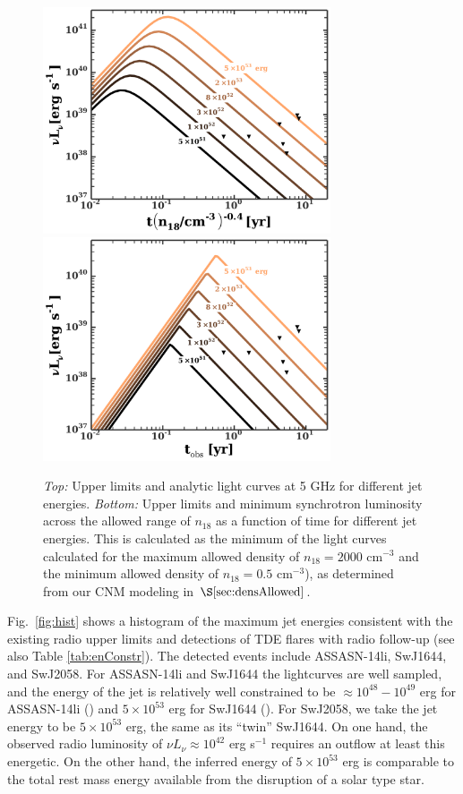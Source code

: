 \documentclass[usenatbib,fleqn]{mnras}
\begin{document}
\begin{figure}
\includegraphics[width=8.5cm]{e_contours1.pdf}
\includegraphics[width=8.5cm]{e_contours2.pdf}
\caption{\label{fig:econtours} {\it Top:} Upper limits and analytic
  light curves at 5 GHz for different jet energies.  {\it Bottom:}
  Upper limits and minimum synchrotron luminosity across the allowed
  range of $n_{18}$ as a function of time for different jet energies.
  This is calculated as the minimum of the light curves calculated for
  the maximum allowed density of $n_{18} = 2000$ cm$^{-3}$ and the
  minimum allowed density of $n_{18}= 0.5$ cm$^{-3}$), as determined
  from our CNM modeling in $\S\ref{sec:densAllowed}$.}
\end{figure}

Fig.~\ref{fig:hist} shows a histogram of the maximum jet energies
consistent with the existing radio upper limits and detections of TDE
flares with radio follow-up (see also Table \ref{tab:enConstr}).  The
detected events include ASSASN-14li, SwJ1644, and SwJ2058.  For
ASSASN-14li and SwJ1644 the lightcurves are well sampled, and the
energy of the jet is relatively well constrained to be $\approx
10^{48}-10^{49}$ erg for ASSASN-14li (\citealt{van-Velzen+2015,
  Alexander+2015}) and $5\times 10^{53}$ erg for SwJ1644
(\citealt{Mimica+2015}).  For SwJ2058, we take the jet energy to be
$5\times 10^{53}$ erg, the same as its ``twin'' SwJ1644.  On one hand, the
observed radio luminosity of $\nu L_{\nu }\approx 10^{42}$ erg
s$^{-1}$ \citep{Cenko+2012} requires an outflow at least this
energetic.  On the other hand, the inferred energy of $5\times
10^{53}$ erg is comparable to the total rest mass energy available
from the disruption of a solar type star.
\end{document}
